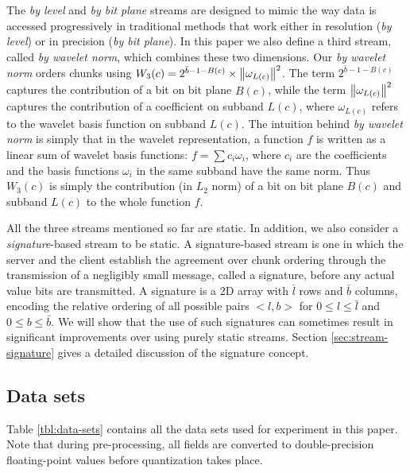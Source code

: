The \emph{by level} and \emph{by bit plane} streams are designed to mimic the way data is accessed
progressively in traditional methods that work either in resolution (\emph{by level}) or in
precision (\emph{by bit plane}). In this paper we also define a third stream, called \emph{by
wavelet norm}, which combines these two dimensions. Our \emph{by wavelet norm} orders chunks using
$W_3(c)=2^{\bar{b}-1-B(c)}\times \left\lVert\omega_{L(c)}\right\rVert^2$. The term $2^{\bar{b}-1-B(c)}$ captures the
contribution of a bit on bit plane $B(c)$, while the term $\left\lVert\omega_{L(c)}\right\rVert^2$ captures the
contribution of a coefficient on subband $L(c)$, where $\omega_{L(c)}$ refers to the wavelet basis
function on subband $L(c)$. The intuition behind \emph{by wavelet norm} is simply that in the
wavelet representation, a function $f$ is written as a linear sum of wavelet basis functions:
$f=\sum{c_i\omega_i}$, where $c_i$ are the coefficients and the basis functions $\omega_i$ in the
same subband have the same norm. Thus $W_3(c)$ is simply the contribution (in $L_2$ norm) of a bit
on bit plane $B(c)$ and subband $L(c)$ to the whole function $f$.

All the three streams mentioned so far are static. In addition, we also consider a
\emph{signature}-based stream to be static. A signature-based stream is one in which the server and
the client establish the agreement over chunk ordering through the transmission of a negligibly
small message, called a signature, before any actual value bits are transmitted. A signature is a 2D
array with $\bar{l}$ rows and $\bar{b}$ columns, encoding the relative ordering of all possible
pairs $<l,b>$ for $0\leq l \leq \bar{l}$ and $0\leq b \leq \bar{b}$. We will show that the use of
such signatures can sometimes result in significant improvements over using purely static streams.
Section \ref{sec:stream-signature} gives a detailed discussion of the signature concept.

\subsection{Data sets}
\label{sec:data-sets}

Table \ref{tbl:data-sets} contains all the data sets used for experiment in this paper. Note that
during pre-processing, all fields are converted to double-precision floating-point values before
quantization takes place.

